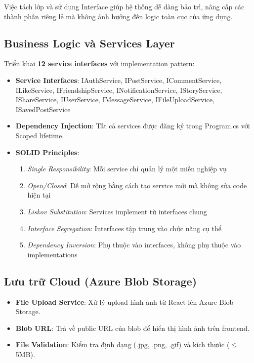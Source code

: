 \documentclass[a4paper]{article}
\begin{document}
    Việc tách lớp và sử dụng Interface giúp hệ thống dễ dàng bảo trì, nâng cấp các thành phần riêng lẻ mà không ảnh hưởng đến logic toàn cục của ứng dụng.

    \subsection{Business Logic và Services Layer}
    Triển khai \textbf{12 service interfaces} với implementation pattern:
    \begin{itemize}
        \item \textbf{Service Interfaces}: IAuthService, IPostService, ICommentService, ILikeService, IFriendshipService, INotificationService, IStoryService, IShareService, IUserService, IMessageService, IFileUploadService, ISavedPostService
        \item \textbf{Dependency Injection}: Tất cả services được đăng ký trong Program.cs với Scoped lifetime.
        \item \textbf{SOLID Principles}: 
        \begin{enumerate}
            \item \textit{Single Responsibility}: Mỗi service chỉ quản lý một miền nghiệp vụ
            \item \textit{Open/Closed}: Dễ mở rộng bằng cách tạo service mới mà không sửa code hiện tại
            \item \textit{Liskov Substitution}: Services implement từ interfaces chung
            \item \textit{Interface Segregation}: Interfaces tập trung vào chức năng cụ thể
            \item \textit{Dependency Inversion}: Phụ thuộc vào interfaces, không phụ thuộc vào implementations
        \end{enumerate}
    \end{itemize}

    \subsection{Lưu trữ Cloud (Azure Blob Storage)}
    \begin{itemize}
        \item \textbf{File Upload Service}: Xử lý upload hình ảnh từ React lên Azure Blob Storage.
        \item \textbf{Blob URL}: Trả về public URL của blob để hiển thị hình ảnh trên frontend.
        \item \textbf{File Validation}: Kiểm tra định dạng (.jpg, .png, .gif) và kích thước ($\leq$ 5MB).
    \end{itemize}
\end{document}
